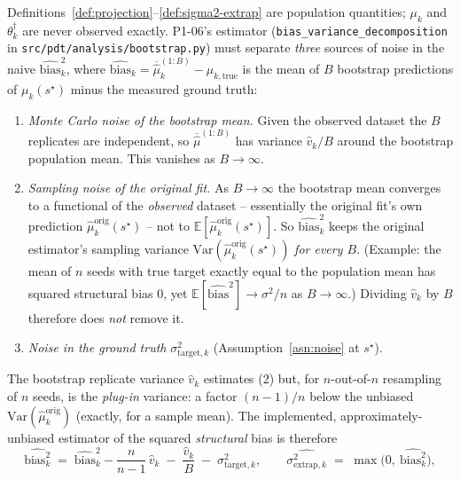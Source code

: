 \begin{remark}
\label{rem:sigma2-extrap-estimator}
Definitions~\ref{def:projection}--\ref{def:sigma2-extrap} are population quantities;
$\mu_k$ and $\theta_k^{\dagger}$ are never observed exactly. P1-06's estimator
(\texttt{bias\_variance\_decomposition} in \texttt{src/pdt/analysis/bootstrap.py})
must separate \emph{three} sources of noise in the naive $\widehat{\mathrm{bias}}_k^2$,
where $\widehat{\mathrm{bias}}_k = \overline{\hat\mu}_k^{(1:B)} - \mu_{k,\mathrm{true}}$
is the mean of $B$ bootstrap predictions of $\mu_k(s^\star)$ minus the measured ground
truth:
\begin{enumerate}
  \item \emph{Monte Carlo noise of the bootstrap mean.} Given the observed dataset the
    $B$ replicates are independent, so $\overline{\hat\mu}^{(1:B)}$ has variance
    $\hat v_k / B$ around the bootstrap population mean. This vanishes as
    $B \to \infty$.
  \item \emph{Sampling noise of the original fit.} As $B \to \infty$ the bootstrap mean
    converges to a functional of the \emph{observed} dataset -- essentially the original
    fit's own prediction $\hat\mu_k^{\mathrm{orig}}(s^\star)$ -- not to
    $\mathbb{E}[\hat\mu_k^{\mathrm{orig}}(s^\star)]$. So $\widehat{\mathrm{bias}}_k^2$
    keeps the original estimator's sampling variance
    $\mathrm{Var}(\hat\mu_k^{\mathrm{orig}}(s^\star))$ \emph{for every $B$}. (Example: the
    mean of $n$ seeds with true target exactly equal to the population mean has squared
    structural bias $0$, yet $\mathbb{E}[\widehat{\mathrm{bias}}^2] \to \sigma^2/n$ as
    $B \to \infty$.) Dividing $\hat v_k$ by $B$ therefore does \emph{not} remove it.
  \item \emph{Noise in the ground truth} $\sigma^2_{\mathrm{target}, k}$
    (Assumption~\ref{asn:noise} at $s^\star$).
\end{enumerate}
The bootstrap replicate variance $\hat v_k$ estimates (2) but, for $n$-out-of-$n$
resampling of $n$ seeds, is the \emph{plug-in} variance: a factor $(n-1)/n$ below the
unbiased $\mathrm{Var}(\hat\mu_k^{\mathrm{orig}})$ (exactly, for a sample mean). The
implemented, approximately-unbiased estimator of the squared \emph{structural} bias is
therefore
\[
  \widehat{\mathrm{bias}^2_k}\;=\;\widehat{\mathrm{bias}}_k^2
    - \frac{n}{n-1}\,\hat v_k \;-\; \frac{\hat v_k}{B} \;-\; \sigma^2_{\mathrm{target}, k},
  \qquad
  \widehat{\sigma^2_{\mathrm{extrap}, k}}\;=\;\max\!\big(0,\ \widehat{\mathrm{bias}^2_k}\big),
\]
\end{remark}
